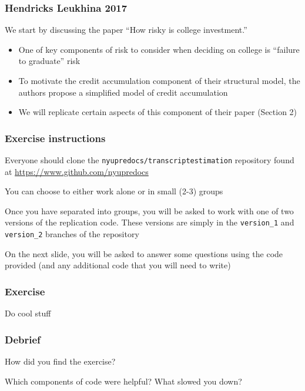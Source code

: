 \documentclass[10pt]{beamer}
\begin{document}
  \begin{frame} \frametitle{Hendricks Leukhina 2017}

    We start by discussing the paper ``How risky is college investment.''

    \begin{itemize}
      \item One of key components of risk to consider when deciding on college is ``failure to
            graduate'' risk
      \item To motivate the credit accumulation component of their structural model, the authors
            propose a simplified model of credit accumulation
      \item We will replicate certain aspects of this component of their paper (Section 2)
    \end{itemize}

  \end{frame}

  \begin{frame} \frametitle{Exercise instructions}

    Everyone should clone the \texttt{nyupredocs/transcriptestimation} repository found at
    \url{https://www.github.com/nyupredocs}

    You can choose to either work alone or in small (2-3) groups

    Once you have separated into groups, you will be asked to work with one of two versions of the
    replication code. These versions are simply in the \texttt{version\_1} and \texttt{version\_2}
    branches of the repository

    On the next slide, you will be asked to answer some questions using the code provided (and any
    additional code that you will need to write)

  \end{frame}

  \begin{frame} \frametitle{Exercise}

    Do cool stuff

  \end{frame}

  \begin{frame} \frametitle{Debrief}

    How did you find the exercise?

    Which components of code were helpful? What slowed you down?

  \end{frame}
\end{document}
